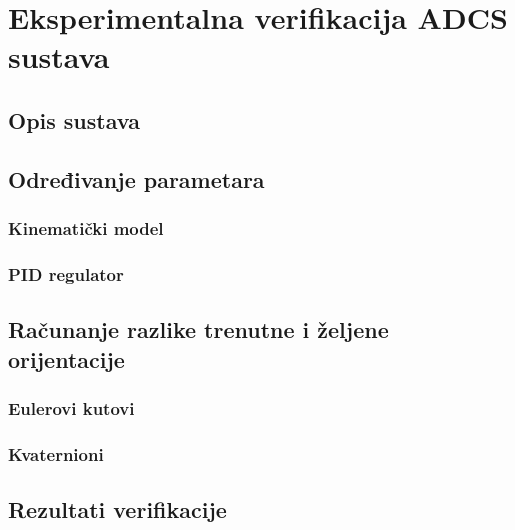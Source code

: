 \documentclass[times, utf8, diplomski, numeric]{templates/template}
\begin{document}
\chapter{Eksperimentalna verifikacija ADCS sustava}{
    \section{Opis sustava}{
    }

    \section{Određivanje parametara}{
        \subsection{Kinematički model}{
        }
    
        \subsection{PID regulator}{
        }
    }

    \section{Računanje razlike trenutne i željene orijentacije}{
        \subsection{Eulerovi kutovi}{
        }

        \subsection{Kvaternioni}{
        }
    }

    \section{Rezultati verifikacije}{
    }
}
\end{document}
